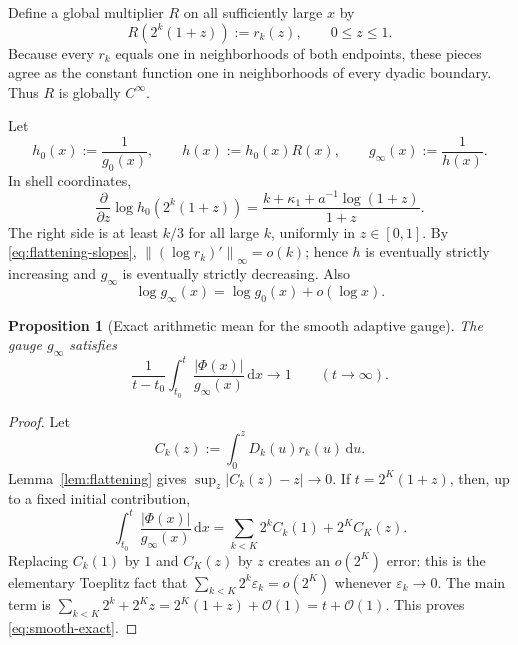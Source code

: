 \documentclass[11pt]{article}
\newtheorem{proposition}[theorem]{Proposition}
\theoremstyle{definition}
\theoremstyle{remark}
\newcommand{\dd}{\,\mathrm d}
\newcommand{\bigO}{\mathcal O}
\newcommand{\norm}[1]{\left\lVert#1\right\rVert}
\begin{document}
Define a global multiplier \(R\) on all sufficiently large \(x\) by
\begin{equation}
 R(2^k(1+z)):=r_k(z),
 \qquad 0\le z\le1.
 \label{eq:R-global}
\end{equation}
Because every \(r_k\) equals one in neighborhoods of both endpoints, these
pieces agree as the constant function one in neighborhoods of every dyadic
boundary.  Thus \(R\) is globally \(C^\infty\).

Let
\begin{equation}
 h_0(x):=\frac1{g_0(x)},
 \qquad
 h(x):=h_0(x)R(x),
 \qquad
 g_{\infty}(x):=\frac1{h(x)}.
 \label{eq:smooth-adaptive}
\end{equation}
In shell coordinates,
\begin{equation}
 \frac{\partial}{\partial z}
 \log h_0(2^k(1+z))
 =\frac{k+\kappa_1+a^{-1}\log(1+z)}{1+z}.
 \label{eq:baseline-slope}
\end{equation}
The right side is at least \(k/3\) for all large \(k\), uniformly in
\(z\in[0,1]\).  By \eqref{eq:flattening-slopes},
\(\norm{(\log r_k)'}_\infty=o(k)\); hence \(h\) is eventually strictly
increasing and \(g_\infty\) is eventually strictly decreasing.  Also
\begin{equation}
 \log g_\infty(x)=\log g_0(x)+o(\log x).
 \label{eq:smooth-rough}
\end{equation}

\begin{proposition}[Exact arithmetic mean for the smooth adaptive gauge]
\label{prop:smooth-adaptive}
The gauge \(g_\infty\) satisfies
\begin{equation}
 \frac1{t-t_0}\int_{t_0}^{t}
 \frac{|\Phi(x)|}{g_\infty(x)}\dd x\longrightarrow1
 \qquad(t\to\infty).
 \label{eq:smooth-exact}
\end{equation}
\end{proposition}

\begin{proof}
Let
\[
 C_k(z):=\int_0^zD_k(u)r_k(u)\dd u.
\]
Lemma~\ref{lem:flattening} gives
\(\sup_z|C_k(z)-z|\to0\).  If
\(t=2^K(1+z)\), then, up to a fixed initial contribution,
\[
 \int_{t_0}^{t}\frac{|\Phi(x)|}{g_\infty(x)}\dd x
 =\sum_{k<K}2^kC_k(1)+2^KC_K(z).
\]
Replacing \(C_k(1)\) by \(1\) and \(C_K(z)\) by \(z\) creates an
\(o(2^K)\) error: this is the elementary Toeplitz fact that
\(\sum_{k<K}2^k\varepsilon_k=o(2^K)\) whenever \(\varepsilon_k\to0\).
The main term is
\(\sum_{k<K}2^k+2^Kz=2^K(1+z)+\bigO(1)=t+\bigO(1)\).
This proves \eqref{eq:smooth-exact}.
\end{proof}
\end{document}
